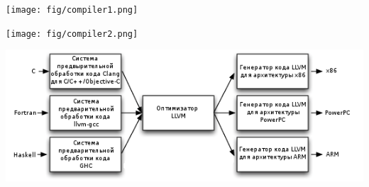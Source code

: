 
\texttt{[image: fig/compiler1.png]}

\pagebreak
\texttt{[image: fig/compiler2.png]}

\noindent\includegraphics[width=\textwidth]{fig/llvm.png}

\secup
